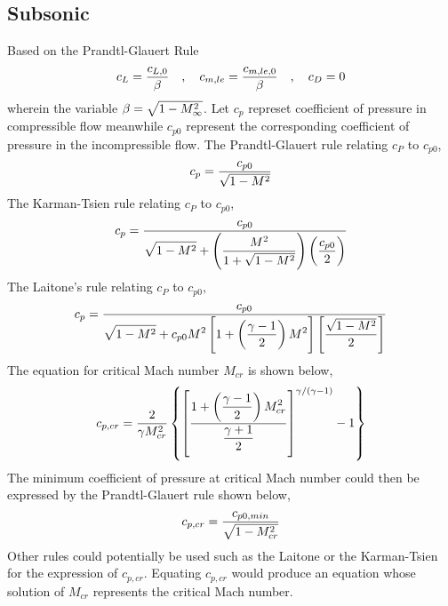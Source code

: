 \documentclass[class=report, 12pt, crop=false]{standalone}
\begin{document}
\begin{center}
\subsection{Subsonic}
\begin{comment}
\end{comment}
Based on the Prandtl-Glauert Rule
$$c_L = \frac{c_{L,0}}{\beta} \quad,\quad c_{m,le}= \frac{c_{m,le,0}}{\beta} \quad,\quad c_D = 0$$
wherein the variable $\beta = \sqrt{1-M_\infty^2}$. Let $c_p$ represet coefficient of pressure in compressible flow meanwhile $c_{p0}$ represent the corresponding coefficient of pressure in the incompressible flow. The Prandtl-Glauert rule relating $c_P$ to $c_{p0}$,
$$c_p = \frac{c_{p0}}{\sqrt{1-M^2}}$$
The Karman-Tsien rule relating $c_P$ to $c_{p0}$,
$$c_p = \frac{c_{p0}}{\displaystyle{\sqrt{1-M^2} + \left(\frac{M^2}{1+\sqrt{1-M^2}}\right)\left(\frac{c_{p0}}{2}\right)}}$$
The Laitone's rule relating $c_P$ to $c_{p0}$,
$$c_p = \frac{c_{p0}}{\displaystyle{\sqrt{1-M^2} + c_{p0} M^2\left[1+\left(\frac{\gamma-1}{2}\right)M^2\right]\left[\frac{\sqrt{1-M^2}}{2}\right]}}$$
The equation for critical Mach number $M_{cr}$ is shown below,
$$c_{p,cr} = \frac{2}{\gamma M_{cr}^2}\left\{\left[\frac{\displaystyle{1+\left(\frac{\gamma-1}{2}\right)M_{cr}^2}}{\displaystyle{\frac{\gamma+1}{2}}}\right]^{\gamma/(\gamma-1)} - 1\right\}$$
The minimum coefficient of pressure at critical Mach number could then be expressed by the Prandtl-Glauert rule shown below,
$$c_{p,cr} = \frac{c_{p0,min}}{\sqrt{1-M_{cr}^2}}$$
Other rules could potentially be used such as the Laitone or the Karman-Tsien for the expression of $c_{p,cr}$. Equating $c_{p,cr}$ would produce an equation whose solution of $M_{cr}$ represents the critical Mach number.
\end{center}
\end{document}
